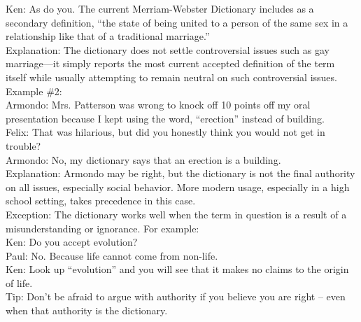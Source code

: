 \documentclass[a4paper,12pt,single,pdftex]{scrartcl}
\begin{document}
{    
      Ken: As do you.  The current Merriam-Webster Dictionary includes as a secondary definition, “the state of being united to a person of the same sex in a relationship like that of a traditional marriage.”
    \\

    
      Explanation: The dictionary does not settle controversial issues such as gay marriage—it simply reports the most current accepted definition of the term itself while usually attempting to remain neutral on such controversial issues.
    \\

    
      Example \#2:
    \\

    
      Armondo: Mrs. Patterson was wrong to knock off 10 points off my oral presentation because I kept using the word, “erection” instead of building.
    \\

    
      Felix: That was hilarious, but did you honestly think you would not get in trouble?
    \\

    
      Armondo:  No, my dictionary says that an erection is a building.
    \\

    
      Explanation: Armondo may be right, but the dictionary is not the final authority on all issues, especially social behavior.  More modern usage, especially in a high school setting, takes precedence in this case.
    \\

    
      Exception: The dictionary works well when the term in question is a result of a misunderstanding or ignorance.  For example:
    \\

    
      Ken: Do you accept evolution?
    \\

    
      Paul: No. Because life cannot come from non-life.
    \\

    
      Ken: Look up “evolution” and you will see that it makes no claims to the origin of life.
    \\

    
      Tip: Don’t be afraid to argue with authority if you believe you are right -- even when that authority is the dictionary.
    \\

  }
\end{document}
